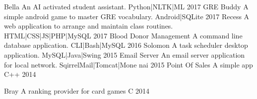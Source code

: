 

\begin{cvprojects}
  \cvproject
    {Bella}%
    {An AI activated student assistant.}%
    {Python|NLTK|ML}%
    {2017}%
  \cvproject
    {GRE Buddy}
    {A simple android game to master GRE vocabulary.}
    {Android|SQLite}
    {2017}
  \cvproject
    {Recess}
    {A web application to arrange and maintain class routines.}
    {HTML|CSS|JS|PHP|MySQL}
    {2017}
  \cvproject
    {Blood Donor Management}
    {A command line database application.}
    {CLI|Bash|MySQL}
    {2016}
  \cvproject
    {Solomon}
    {A task scheduler desktop application.}
    {MySQL|Java|Swing}
    {2015}
  \cvproject
    {Email Server}
    {An email server application for local network.}
    {SqirrelMail|Tomcat|Mone nai}
    {2015}
  \cvproject
    {Point Of Sales}
    {A simple app}
    {C++}
    {2014}

  \cvproject
    {Bray}
    {A ranking provider for card games }
    {C}
    {2014}
\end{cvprojects}